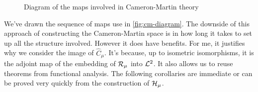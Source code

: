 \begin{figure}
	\centering
	\label{fig:cm-diagram}
	\caption{Diagram of the maps involved in Cameron-Martin theory}
\end{figure}
We've drawn the sequence of maps use in \vref{fig:cm-diagram}. The downside of this approach of constructing the Cameron-Martin space is in how long it takes to set up all the structure involved. However it does have benefits. For me, it justifies why we consider the image of $\hat{C}_{\mu}$. It's because, up to isometric isomorphisms, it is the adjoint map of the embedding of $\mathcal R_{\mu}$ into $\mathcal L^2$. It also allows us to reuse theorems from functional analysis. The following corollaries are immediate or can be proved very quickly from the construction of $\mathcal H_{\mu}$.


